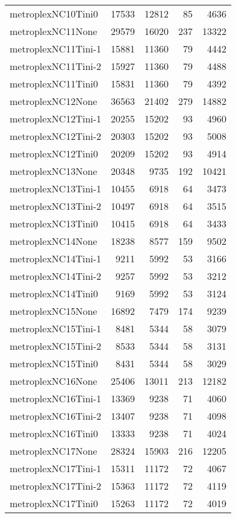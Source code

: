 \begin{longtable}{lrrrr}
metroplexNC10Tini0 & 17533 & 12812 & 85 & 4636 \\
metroplexNC11None & 29579 & 16020 & 237 & 13322 \\
metroplexNC11Tini-1 & 15881 & 11360 & 79 & 4442 \\
metroplexNC11Tini-2 & 15927 & 11360 & 79 & 4488 \\
metroplexNC11Tini0 & 15831 & 11360 & 79 & 4392 \\
metroplexNC12None & 36563 & 21402 & 279 & 14882 \\
metroplexNC12Tini-1 & 20255 & 15202 & 93 & 4960 \\
metroplexNC12Tini-2 & 20303 & 15202 & 93 & 5008 \\
metroplexNC12Tini0 & 20209 & 15202 & 93 & 4914 \\
metroplexNC13None & 20348 & 9735 & 192 & 10421 \\
metroplexNC13Tini-1 & 10455 & 6918 & 64 & 3473 \\
metroplexNC13Tini-2 & 10497 & 6918 & 64 & 3515 \\
metroplexNC13Tini0 & 10415 & 6918 & 64 & 3433 \\
metroplexNC14None & 18238 & 8577 & 159 & 9502 \\
metroplexNC14Tini-1 & 9211 & 5992 & 53 & 3166 \\
metroplexNC14Tini-2 & 9257 & 5992 & 53 & 3212 \\
metroplexNC14Tini0 & 9169 & 5992 & 53 & 3124 \\
metroplexNC15None & 16892 & 7479 & 174 & 9239 \\
metroplexNC15Tini-1 & 8481 & 5344 & 58 & 3079 \\
metroplexNC15Tini-2 & 8533 & 5344 & 58 & 3131 \\
metroplexNC15Tini0 & 8431 & 5344 & 58 & 3029 \\
metroplexNC16None & 25406 & 13011 & 213 & 12182 \\
metroplexNC16Tini-1 & 13369 & 9238 & 71 & 4060 \\
metroplexNC16Tini-2 & 13407 & 9238 & 71 & 4098 \\
metroplexNC16Tini0 & 13333 & 9238 & 71 & 4024 \\
metroplexNC17None & 28324 & 15903 & 216 & 12205 \\
metroplexNC17Tini-1 & 15311 & 11172 & 72 & 4067 \\
metroplexNC17Tini-2 & 15363 & 11172 & 72 & 4119 \\
metroplexNC17Tini0 & 15263 & 11172 & 72 & 4019 \\

\end{longtable}
